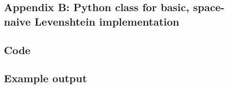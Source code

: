 \documentclass[a4paper,11pt,twoside,notitlepage]{article}
\begin{document}
\begin{appendices}
          \clearpage
          \section{Appendix B: Python class for basic, space-naive Levenshtein
            implementation}
          \label{levenshtein-implement}
          \subsection{Code}
          
          \subsection{Example output}
        \end{appendices}
        
\end{document}
